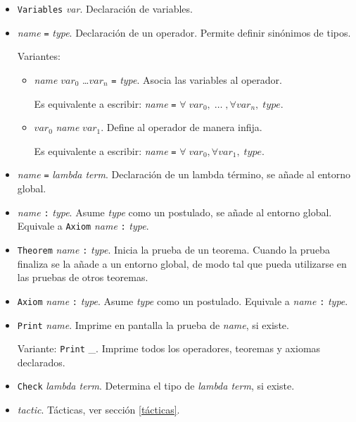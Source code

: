\documentclass[a4paper,11pt]{article}
\theoremstyle{definition}
\begin{document}
\begin{itemize}

\item \texttt{Variables} \textit{var}. Declaración de variables.
\item \textit{name} \texttt{=} \textit{type}. Declaración de un operador.
  Permite definir sinónimos de tipos. 

  Variantes:
  \begin{itemize}
  \item \textit{name} $var_0$ \ldots $var_n$ \texttt{=} \textit{type}.
    Asocia las variables al operador. 

    Es equivalente a escribir:
    \textit{name} \texttt{=} $\forall \; var_0, \; \ldots \; , \forall var_n, \; type$.
  \item $var_0$ \textit{name} $var_1$. Define al operador de manera infija.

    Es equivalente a escribir:
    \textit{name} \texttt{=} $\forall \; var_0, \forall var_1, \; type$.
  \end{itemize}

\item \textit{name} \texttt{=} \textit{lambda term}. Declaración de un lambda término,
se añade al entorno global.

\item \textit{name} \texttt{:} \textit{type}. Asume \textit{type} como un postulado,
se añade al entorno global. Equivale a \texttt{Axiom} \textit{name} \texttt{:} \textit{type}.

\item \texttt{Theorem} \textit{name} \texttt{:} \textit{type}. Inicia la prueba de un
teorema. Cuando la prueba finaliza se la añade a un entorno global, de modo tal que pueda utilizarse en las pruebas de
otros teoremas. 


\item \texttt{Axiom} \textit{name} \texttt{:} \textit{type}. Asume \textit{type} como un postulado.
Equivale a \textit{name} \texttt{:} \textit{type}.

\item \texttt{Print} \textit{name}. Imprime en pantalla la prueba de \textit{name}, si existe.

Variante:
\texttt{Print} \_. Imprime todos los operadores, teoremas y axiomas declarados.

\item \texttt{Check} \textit{lambda term}. Determina el tipo de \textit{lambda term}, si existe.

\item \textit{tactic}. Tácticas, ver sección \ref{tácticas}.

\end{itemize}
\end{document}
